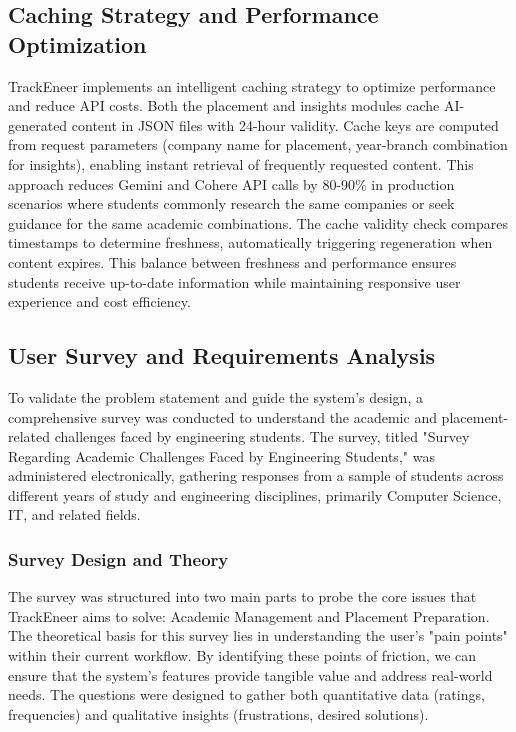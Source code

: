 \documentclass[conference]{IEEEtran}
\begin{document}
\subsection{Caching Strategy and Performance Optimization}
TrackEneer implements an intelligent caching strategy to optimize performance and reduce API costs. Both the placement and insights modules cache AI-generated content in JSON files with 24-hour validity. Cache keys are computed from request parameters (company name for placement, year-branch combination for insights), enabling instant retrieval of frequently requested content. This approach reduces Gemini and Cohere API calls by 80-90\% in production scenarios where students commonly research the same companies or seek guidance for the same academic combinations. The cache validity check compares timestamps to determine freshness, automatically triggering regeneration when content expires. This balance between freshness and performance ensures students receive up-to-date information while maintaining responsive user experience and cost efficiency.

\subsection{User Survey and Requirements Analysis}
To validate the problem statement and guide the system's design, a comprehensive survey was conducted to understand the academic and placement-related challenges faced by engineering students. The survey, titled "Survey Regarding Academic Challenges Faced by Engineering Students," was administered electronically, gathering responses from a sample of students across different years of study and engineering disciplines, primarily Computer Science, IT, and related fields.

\subsubsection{Survey Design and Theory}
The survey was structured into two main parts to probe the core issues that TrackEneer aims to solve: Academic Management and Placement Preparation. The theoretical basis for this survey lies in understanding the user's "pain points" within their current workflow. By identifying these points of friction, we can ensure that the system's features provide tangible value and address real-world needs. The questions were designed to gather both quantitative data (ratings, frequencies) and qualitative insights (frustrations, desired solutions).
\end{document}

